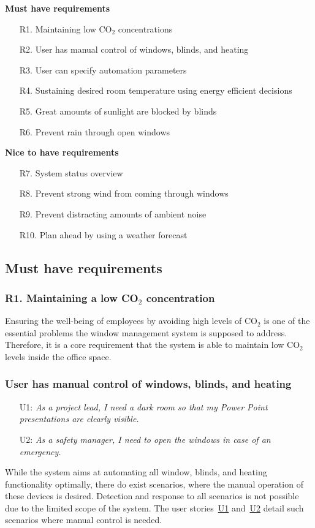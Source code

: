 \documentclass[runningheads]{llncs}
\begin{document}
\begin{description}
\item{\textbf{Must have requirements}}\
\begin{itemize}
    \item [R1.] Maintaining low CO$_2$ concentrations
    \item [R2.] User has manual control of windows, blinds, and heating
    \item [R3.] User can specify automation parameters
    \item [R4.] Sustaining desired room temperature using energy efficient decisions
    \item [R5.] Great amounts of sunlight are blocked by blinds
    \item [R6.] Prevent rain through open windows
\end{itemize}
\item{\textbf{Nice to have requirements}}\
\begin{itemize}
    \item [R7.] System status overview 
    \item [R8.] Prevent strong wind from coming through windows 
    \item [R9.] Prevent distracting amounts of ambient noise
    \item [R10.] Plan ahead by using a weather forecast 
\end{itemize}
\end{description}
\subsection{Must have requirements}
\subsubsection{R1. Maintaining a low CO$_2$ concentration}

Ensuring the well-being of employees by avoiding high levels of CO$_2$ is one of the essential problems the window management system is supposed to address. Therefore, it is a core requirement that the system is able to maintain low CO$_2$ levels inside the office space.

\subsubsection{User has manual control of windows, blinds, and heating}
\begin{itemize}
    \item [U1:] \label{r2u1} \textit{As a project lead, I need a dark room so that my Power Point presentations are clearly visible.}
    \item [U2:] \label{r2u2} \textit{As a safety manager, I need to open the windows in case of an emergency.}
\end{itemize}
While the system aims at automating all window, blinds, and heating functionality optimally, there do exist scenarios, where the manual operation of these devices is desired. Detection and response to all scenarios is not possible due to the limited scope of the system. The user stories~\hyperref[r2u1]{U1} and~\hyperref[r2u1]{U2} detail such scenarios where manual control is needed. 
\end{document}
